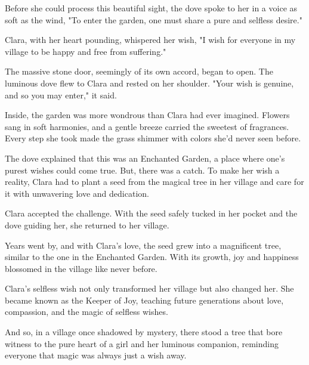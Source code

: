 \documentclass[10pt,fullpage, a4paper, titlepage]{article}
\begin{document}
Before she could process this beautiful sight, the dove spoke to her in a voice as soft as the wind, "To enter the garden, one must share a pure and selfless desire."

Clara, with her heart pounding, whispered her wish, "I wish for everyone in my village to be happy and free from suffering."

The massive stone door, seemingly of its own accord, began to open. The luminous dove flew to Clara and rested on her shoulder. "Your wish is genuine, and so you may enter," it said.

Inside, the garden was more wondrous than Clara had ever imagined. Flowers sang in soft harmonies, and a gentle breeze carried the sweetest of fragrances. Every step she took made the grass shimmer with colors she'd never seen before.

The dove explained that this was an Enchanted Garden, a place where one’s purest wishes could come true. But, there was a catch. To make her wish a reality, Clara had to plant a seed from the magical tree in her village and care for it with unwavering love and dedication.

Clara accepted the challenge. With the seed safely tucked in her pocket and the dove guiding her, she returned to her village.

Years went by, and with Clara's love, the seed grew into a magnificent tree, similar to the one in the Enchanted Garden. With its growth, joy and happiness blossomed in the village like never before.

Clara's selfless wish not only transformed her village but also changed her. She became known as the Keeper of Joy, teaching future generations about love, compassion, and the magic of selfless wishes.

And so, in a village once shadowed by mystery, there stood a tree that bore witness to the pure heart of a girl and her luminous companion, reminding everyone that magic was always just a wish away.
\end{document}
